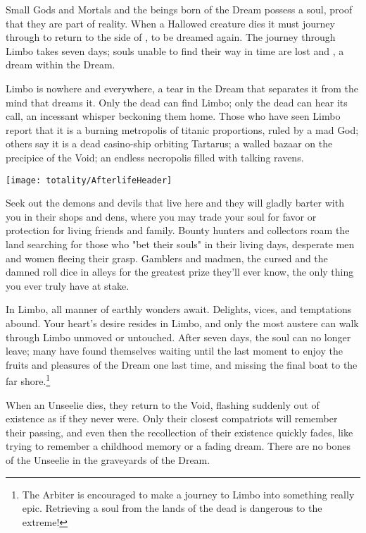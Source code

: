 

Small Gods and Mortals and the beings born of the Dream possess a soul, proof that they are part of reality.  When a Hallowed creature dies it must journey through  to return to the side of \TheAuthority, to be dreamed again. The journey through Limbo takes seven days; souls unable to find their way in time are lost and , a dream within the Dream.

Limbo is nowhere and everywhere, a tear in the Dream that separates it from the mind that dreams it. Only the dead can find Limbo; only the dead can hear its call, an incessant whisper beckoning them home. Those who have seen Limbo report that it is a burning metropolis of titanic proportions, ruled by a mad God; others say it is a dead casino-ship orbiting Tartarus; a walled bazaar on the precipice of the Void; an endless necropolis filled with talking ravens.

\texttt{[image: totality/AfterlifeHeader]}

Seek out the demons and devils that live here and they will gladly barter with you in their shops and dens, where you may trade your soul for favor or protection for living friends and family. Bounty hunters and collectors roam the land searching for those who "bet their souls" in their living days, desperate men and women fleeing their grasp. Gamblers and madmen, the cursed and the damned roll dice in alleys for the greatest prize they'll ever know, the only thing you ever truly have at stake. 

In Limbo, all manner of earthly wonders await. Delights, vices, and temptations abound. Your heart's desire resides in Limbo, and only the most austere can walk through Limbo unmoved or untouched. After seven days, the soul can no longer leave; many have found themselves waiting until the last moment to enjoy the fruits and pleasures of the Dream one last time, and missing the final boat to the far shore.\footnote{The Arbiter is encouraged to make a journey to Limbo into something really epic. Retrieving a soul from the lands of the dead is dangerous to the extreme!}

When an Unseelie dies, they return to the Void, flashing suddenly out of existence as if they never were. Only their closest compatriots will remember their passing, and even then the recollection of their existence quickly fades, like trying to remember a childhood memory or a fading dream. There are no bones of the Unseelie in the graveyards of the Dream.
